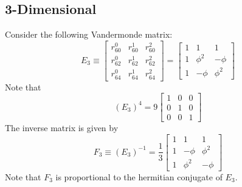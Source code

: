 \subsection{3-Dimensional}
Consider the following Vandermonde matrix:
\begin{equation}
    E_{3} \equiv \begin{bmatrix}
        r_{60}^{0} & r_{60}^{1} & r_{60}^{2} \\
        r_{62}^{0} & r_{62}^{1} & r_{62}^{2} \\
        r_{64}^{0} & r_{64}^{1} & r_{64}^{2}
    \end{bmatrix} = \begin{bmatrix}
        1 & 1 & 1 \\
        1 & \phi^{2} & -\phi \\
        1 & -\phi & \phi^{2}
    \end{bmatrix}
\end{equation}
Note that
\begin{equation}
    \left( E_{3} \right)^{4} = 9 \begin{bmatrix}
        1 & 0 & 0 \\
        0 & 1 & 0 \\
        0 & 0 & 1
    \end{bmatrix}
\end{equation}
The inverse matrix is given by
\begin{equation}
    F_{3} \equiv \left( E_{3} \right)^{-1} = \frac{1}{3} \begin{bmatrix}
        1 & 1 & 1 \\
        1 & -\phi & \phi^{2} \\
        1 & \phi^{2} & -\phi
    \end{bmatrix}
\end{equation}
Note that $F_{3}$ is proportional to the hermitian conjugate of $E_{3}$.
